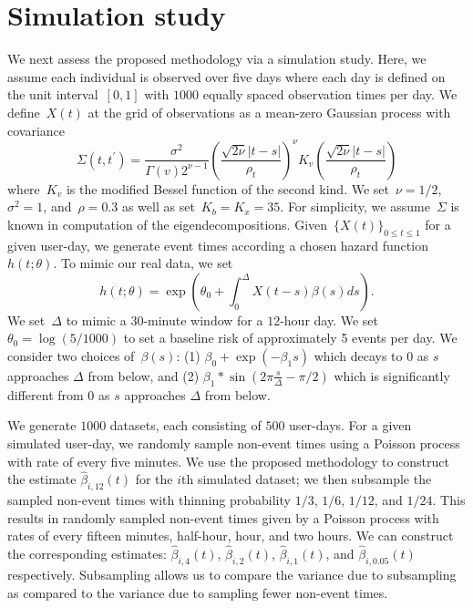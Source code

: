 \documentclass[12pt]{amsart}
\begin{document}
\section{Simulation study} \label{section:simstudy}

We next assess the proposed methodology via a simulation study. Here, we assume each individual is observed over five days where each day is defined on the unit interval~$[0,1]$ with $1000$ equally spaced observation times per day. We define~$X(t)$ at the grid of observations as a mean-zero Gaussian process with covariance
\[
  \Sigma (t, t^\prime) =
  \frac{\sigma^2}{\Gamma (v) 2^{\nu-1}}
  \left( \frac{\sqrt{2 \nu} |t-s|}{\rho_t} \right)^{\nu}
  K_v \left( \frac{\sqrt{2 \nu} |t-s|}{\rho_t} \right)
\]
where~$K_v$ is the modified Bessel function of the second kind.  We set~$\nu = 1/2$, $\sigma^2 = 1$, and~$\rho = 0.3$ as well as set~$K_b = K_x = 35$.  For simplicity, we assume~$\Sigma$ is known in computation of the eigendecompositions. Given~$\{ X(t) \}_{0 \leq t \leq 1}$ for a given user-day, we generate event times according a chosen hazard function~$h (t; \theta)$.  To mimic our real data, we set
\[
h(t; \theta) = \exp \left( \theta_0 + \int_{0}^{\Delta} X(t-s) \beta(s) ds \right).
\]
We set~$\Delta$ to mimic a 30-minute window for a $12$-hour day.  We set~$\theta_0 = \log(5/1000)$ to set a baseline risk of approximately 5 events per day. We consider two choices of~$\beta(s)$: (1) $\beta_0 + \exp(- \beta_1 s) $ which decays to 0 as $s$ approaches $\Delta$ from below, and (2) $\beta_1  * \sin \left( 2 \pi \frac{s}{\Delta} - \pi/2 \right)$ which is significantly different from 0 as $s$ approaches $\Delta$ from below.

We generate $1000$ datasets, each consisting of $500$ user-days.  For a given simulated user-day, we randomly sample non-event times using a Poisson process with rate of every five minutes.  We use the proposed methodology to construct the estimate $\hat \beta_{i,12} (t)$ for the $i$th simulated dataset; we then subsample the sampled non-event times with thinning probability $1/3$, $1/6$, $1/12$, and $1/24$.  This results in randomly sampled non-event times given by a Poisson process with rates of every fifteen minutes, half-hour, hour, and two hours.  We can construct the corresponding estimates: $\hat \beta_{i,4} (t)$, $\hat \beta_{i,2} (t)$, $\hat \beta_{i,1} (t)$, and $\hat \beta_{i,0.05} (t)$ respectively. Subsampling allows us to compare the variance due to subsampling as compared to the variance due to sampling fewer non-event times.
\end{document}
